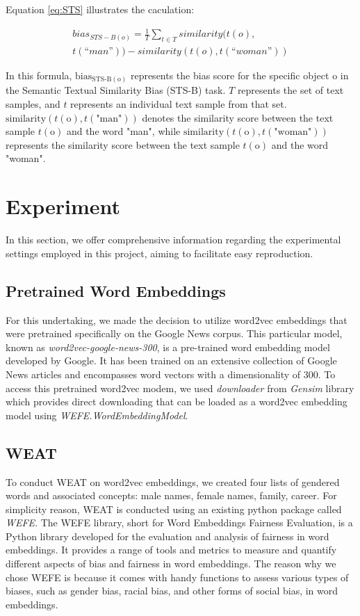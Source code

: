 \documentclass[11pt]{article}
\begin{document}
Equation \ref{eq:STS} illustrates the caculation:

\begin{equation}
\label{eq:STS}
\begin{split}
bias_{STS-B(o)} = \frac{1}{T} \sum_{t\in T} similarity(t(o),\\
t(“man”)) - similarity(t(o),t(“woman”))   
\end{split}
\end{equation}

In this formula, $\text{bias}_{\text{STS-B}(\text{o})}$ represents the bias score for the specific object $\text{o}$ in the Semantic Textual Similarity Bias (STS-B) task. $T$ represents the set of text samples, and $t$ represents an individual text sample from that set. $\text{similarity}(t(\text{o}), t(\text{"man"}))$ denotes the similarity score between the text sample $t(\text{o})$ and the word "man", while $\text{similarity}(t(\text{o}), t(\text{"woman"}))$ represents the similarity score between the text sample $t(\text{o})$ and the word "woman".


\section{Experiment}
In this section, we offer comprehensive information regarding the experimental settings employed in this project, aiming to facilitate easy reproduction.

\subsection{Pretrained Word Embeddings}
For this undertaking, we made the decision to utilize word2vec embeddings that were pretrained specifically on the Google News corpus. This particular model, known as \textit{word2vec-google-news-300}, is a pre-trained word embedding model developed by Google. It has been trained on an extensive collection of Google News articles and encompasses word vectors with a dimensionality of 300. To access this pretrained word2vec modem, we used \textit{downloader} from \textit{Gensim} library which provides direct downloading that can be loaded as a word2vec embedding model using \textit{WEFE.WordEmbeddingModel}.\\

\subsection{WEAT}
To conduct WEAT on word2vec embeddings, we created four lists of gendered words and associated concepts: male names, female names, family, career. For simplicity reason, WEAT is conducted using an existing python package called \textit{WEFE}. The WEFE library, short for Word Embeddings Fairness Evaluation, is a Python library developed for the evaluation and analysis of fairness in word embeddings. It provides a range of tools and metrics to measure and quantify different aspects of bias and fairness in word embeddings. The reason why we chose WEFE is because it comes with handy functions to assess various types of biases, such as gender bias, racial bias, and other forms of social bias, in word embeddings. \\
\end{document}
